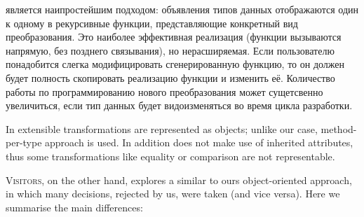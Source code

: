  является наипростейшим подходом: объявления типов данных отображаются один к одному в рекурсивные функции, представляющие конкретный вид преобразования. Это наиболее эффективная реализация (функции вызываются напрямую, без позднего связывания), но нерасширяемая. Если пользователю понадобится слегка модифицировать сгенерированную функцию, то он должен будет полность скопировать реализацию функции и изменить её. Количество работы по программированию нового преобразования может сущетсвенно увеличиться, если тип данных будет видоизменяться во время цикла разработки.

In  extensible transformations are represented as objects; unlike our case, method-per-type approach is used. In addition 
 does not make use of inherited attributes, thus some transformations like equality or comparison are not representable.

\textsc{Visitors}, on the other hand, explores a similar to ours object-oriented approach, in which many decisions, rejected by us, were taken (and vice versa). Here
we summarise the main differences:

